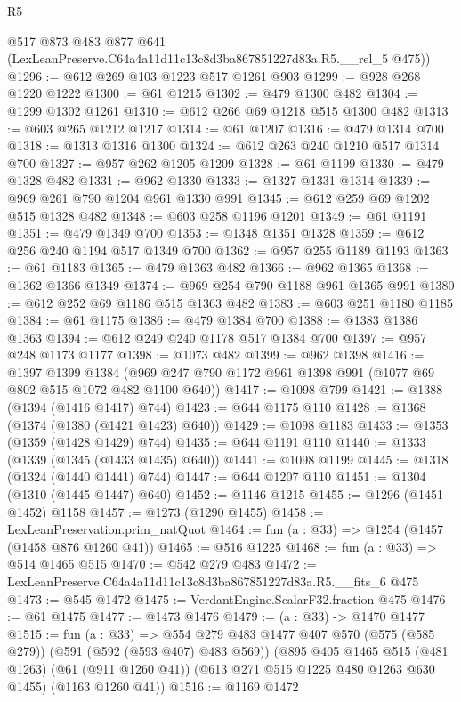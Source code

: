 \begin{lexlean}{R5}
\begin{coremodule}
      @517
      @873
      @483
      @877
      @641
      (LexLeanPreserve.C64a4a11d11c13c8d3ba867851227d83a.R5.__rel_5 @475))
@1296 := @612 @269 @103 @1223 @517 @1261 @903
@1299 := @928 @268 @1220 @1222
@1300 := @61 @1215
@1302 := @479 @1300 @482
@1304 := @1299 @1302 @1261
@1310 := @612 @266 @69 @1218 @515 @1300 @482
@1313 := @603 @265 @1212 @1217
@1314 := @61 @1207
@1316 := @479 @1314 @700
@1318 := @1313 @1316 @1300
@1324 := @612 @263 @240 @1210 @517 @1314 @700
@1327 := @957 @262 @1205 @1209
@1328 := @61 @1199
@1330 := @479 @1328 @482
@1331 := @962 @1330
@1333 := @1327 @1331 @1314
@1339 := @969 @261 @790 @1204 @961 @1330 @991
@1345 := @612 @259 @69 @1202 @515 @1328 @482
@1348 := @603 @258 @1196 @1201
@1349 := @61 @1191
@1351 := @479 @1349 @700
@1353 := @1348 @1351 @1328
@1359 := @612 @256 @240 @1194 @517 @1349 @700
@1362 := @957 @255 @1189 @1193
@1363 := @61 @1183
@1365 := @479 @1363 @482
@1366 := @962 @1365
@1368 := @1362 @1366 @1349
@1374 := @969 @254 @790 @1188 @961 @1365 @991
@1380 := @612 @252 @69 @1186 @515 @1363 @482
@1383 := @603 @251 @1180 @1185
@1384 := @61 @1175
@1386 := @479 @1384 @700
@1388 := @1383 @1386 @1363
@1394 := @612 @249 @240 @1178 @517 @1384 @700
@1397 := @957 @248 @1173 @1177
@1398 := @1073 @482
@1399 := @962 @1398
@1416 := @1397
    @1399
    @1384
    (@969 @247 @790 @1172 @961 @1398 @991 (@1077 @69 @802 @515 @1072 @482 @1100 @640))
@1417 := @1098 @799
@1421 := @1388 (@1394 (@1416 @1417) @744)
@1423 := @644 @1175 @110
@1428 := @1368 (@1374 (@1380 (@1421 @1423) @640))
@1429 := @1098 @1183
@1433 := @1353 (@1359 (@1428 @1429) @744)
@1435 := @644 @1191 @110
@1440 := @1333 (@1339 (@1345 (@1433 @1435) @640))
@1441 := @1098 @1199
@1445 := @1318 (@1324 (@1440 @1441) @744)
@1447 := @644 @1207 @110
@1451 := @1304 (@1310 (@1445 @1447) @640)
@1452 := @1146 @1215
@1455 := @1296 (@1451 @1452) @1158
@1457 := @1273 (@1290 @1455)
@1458 := LexLeanPreservation.prim_natQuot
@1464 := fun (a : @33) => @1254 (@1457 (@1458 @876 @1260 @41))
@1465 := @516 @1225
@1468 := fun (a : @33) => @514 @1465 @515
@1470 := @542 @279 @483
@1472 := LexLeanPreserve.C64a4a11d11c13c8d3ba867851227d83a.R5.__fits_6 @475
@1473 := @545 @1472
@1475 := VerdantEngine.ScalarF32.fraction @475
@1476 := @61 @1475
@1477 := @1473 @1476
@1479 := (a : @33) -> @1470 @1477
@1515 := fun (a : @33) =>
  @554
    @279
    @483
    @1477
    @407
    @570
    (@575 (@585 @279))
    (@591 (@592 (@593 @407) @483 @569))
    (@895
      @405
      @1465
      @515
      (@481 @1263)
      (@61 (@911 @1260 @41))
      (@613 @271 @515 @1225 @480 @1263 @630 @1455)
      (@1163 @1260 @41))
@1516 := @1169 @1472

\end{coremodule}
\end{lexlean}
